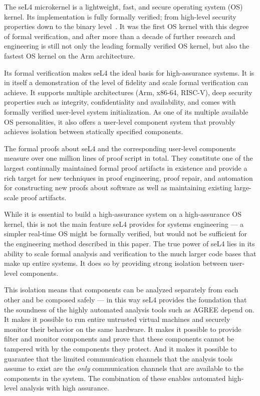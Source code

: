 
The seL4 microkernel is a lightweight, fast, and secure operating system (OS) kernel.
Its implementation is fully formally verified; from high-level security properties
down to the binary level~\cite{sel4-formal}. It was the first OS kernel with this
degree of formal verification, and after more than a decade of further research
and engineering is still not only the leading formally verified OS kernel, but also
the fastest OS kernel on the Arm architecture.

Its formal verification makes seL4 the ideal basis for high-assurance systems.
It is in itself a demonstration of the level of fidelity and scale formal
verification can achieve. It supports multiple architectures (Arm, x86-64,
RISC-V), deep security properties such as integrity, confidentiality and
availability, and comes with formally verified user-level system initialization.
As one of its multiple available OS personalities, it also offers a user-level component
system that provably achieves isolation between statically specified components.

The formal proofs about seL4 and the corresponding user-level components measure
over one million lines of proof script in total. They constitute one of the
largest continually maintained formal proof artifacts in existence and provide a
rich target for new techniques in proof engineering, proof repair, and
automation for constructing new proofs about software as well as maintaining
existing large-scale proof artifacts.

While it is essential to build a high-assurance system on a high-assurance OS
kernel, this is not the main feature seL4 provides for systems engineering --- a
simpler real-time OS might be formally verified, but would not be sufficient for the
engineering method described in this paper. The true power of seL4 lies in its
ability to scale formal analysis and verification to the much larger code bases
that make up entire systems. It does so by providing strong isolation between
user-level components.

This isolation means that components can be analyzed separately from each other
and be composed safely --- in this way seL4 provides the foundation that the soundness of the highly
automated analysis tools such as AGREE depend on. It makes it possible to run
entire untrusted virtual machines and securely monitor their behavior on the
same hardware. It makes it possible to provide filter and monitor components and
prove that these components cannot be tampered with by the components they protect.
And it makes it possible to guarantee that the limited communication channels that the analysis tools
assume to exist are the \emph{only} communication channels that are available to the
components in the system. The combination of these enables automated
high-level analysis with high assurance.
